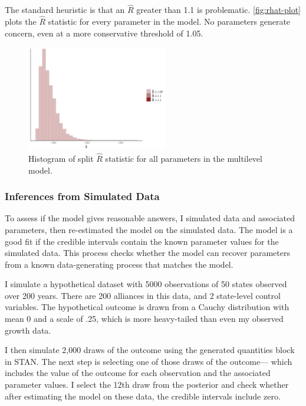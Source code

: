 \documentclass[12pt]{article}
\begin{document}
The standard heuristic is that an $\hat{R}$ greater than 1.1 is problematic. 
\autoref{fig:rhat-plot} plots the $\hat{R}$ statistic for every parameter in the model. 
No parameters generate concern, even at a more conservative threshold of 1.05. 


\begin{figure}[htbp]
	\centering
		\includegraphics[width=0.55\textwidth]{rhat-plot.pdf}
	\caption{Histogram of split $\hat{R}$ statistic for all parameters in the multilevel model.}
	\label{fig:rhat-plot}
\end{figure}


\subsubsection{Inferences from Simulated Data}


To assess if the model gives reasonable answers, I simulated data and associated parameters, then re-estimated the model on the simulated data.
The model is a good fit if the credible intervals contain the known parameter values for the simulated data. 
This process checks whether the model can recover parameters from a known data-generating process that matches the model. 


I simulate a hypothetical dataset with 5000 observations of 50 states observed over 200 years. 
There are 200 alliances in this data, and 2 state-level control variables. 
The hypothetical outcome is drawn from a Cauchy distribution with mean 0 and a scale of .25, which is more heavy-tailed than even my observed growth data. 


I then simulate 2,000 draws of the outcome using the generated quantities block in STAN. 
The next step is selecting one of those draws of the outcome--- which includes the value of the outcome for each observation and the associated parameter values. 
I select the 12th draw from the posterior and check whether after estimating the model on these data, the credible intervals include zero. 
\end{document}
